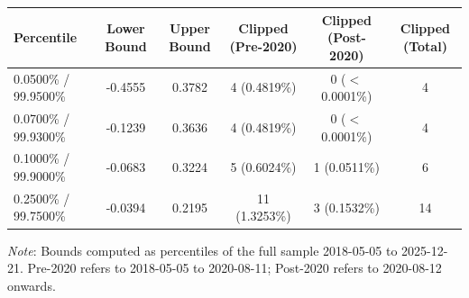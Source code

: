 \begin{tabular}{lccccc}
  \toprule
  \textbf{Percentile} & \textbf{Lower Bound} & \textbf{Upper Bound} & \textbf{Clipped (Pre-2020)} & \textbf{Clipped (Post-2020)} & \textbf{Clipped (Total)} \\ 
  \midrule
  0.0500\% / 99.9500\% & -0.4555 & 0.3782 & 4 (0.4819\%) & 0 ($<$0.0001\%) & 4 \\ 
  0.0700\% / 99.9300\% & -0.1239 & 0.3636 & 4 (0.4819\%) & 0 ($<$0.0001\%) & 4 \\ 
  0.1000\% / 99.9000\% & -0.0683 & 0.3224 & 5 (0.6024\%) & 1 (0.0511\%) & 6 \\ 
  0.2500\% / 99.7500\% & -0.0394 & 0.2195 & 11 (1.3253\%) & 3 (0.1532\%) & 14 \\ 
  \bottomrule
\end{tabular}
\par\vspace{4pt}
\begin{minipage}{\linewidth}
  \footnotesize \textit{Note}: Bounds computed as percentiles of the full sample 2018-05-05 to 2025-12-21. Pre-2020 refers to 2018-05-05 to 2020-08-11; Post-2020 refers to 2020-08-12 onwards.
\end{minipage}